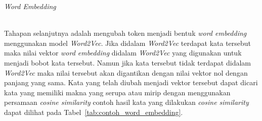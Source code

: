 \begin{enumerate}
  {\bfseries \item \emph{Word Embedding}}\\
  Tahapan selanjutnya adalah mengubah token menjadi bentuk \emph{word embedding} menggunakan
  model \emph{Word2Vec}. Jika didalam \emph{Word2Vec} terdapat kata tersebut maka nilai vektor
  \emph{word embedding} didalam \emph{Word2Vec} yang digunakan untuk menjadi bobot kata tersebut. Namun
  jika kata tersebut tidak terdapat didalam \emph{Word2Vec} maka nilai tersebut akan digantikan dengan
  nilai vektor nol dengan panjang yang sama. Kata yang telah diubah menjadi vektor tersebut dapat
  dicari kata yang memiliki makna yang serupa atau mirip dengan menggunakan persamaan \emph{cosine similarity} contoh
  hasil kata yang dilakukan \emph{cosine similarity} dapat dilihat pada Tabel~\ref{tab:contoh_word_embedding}.


\end{enumerate}
